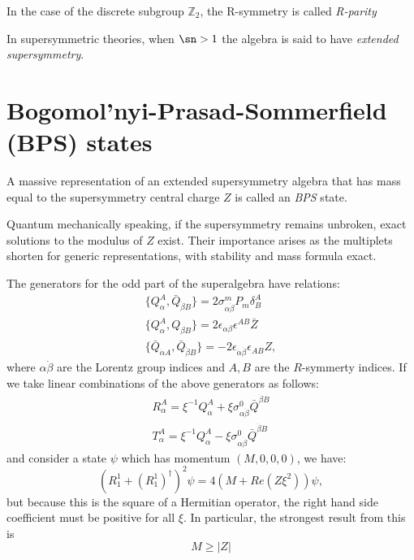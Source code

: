 \begin{remark}
In the case of the discrete subgroup $\mathbb{Z}_2$, the R-symmetry is called \textit{R-parity}
\end{remark}

\begin{definition}
In supersymmetric theories, when $\sn>1$ the algebra is said to have
\textit{extended supersymmetry}.
\end{definition}

\section{Bogomol'nyi-Prasad-Sommerfield (BPS) states}
\begin{definition}
A massive representation of an extended supersymmetry algebra that has mass
equal to the supersymmetry central charge $Z$ is called an \textit{BPS} state.
\end{definition}

Quantum mechanically speaking, if the supersymmetry remains unbroken, exact
solutions to the modulus of $Z$ exist. Their importance arises as the
multiplets shorten for generic representations, with stability and mass formula
exact.

\begin{example}[$d=4$,$\sn=2$]
The generators for the odd part of the superalgebra have relations:
\begin{gather}
  \{Q_\alpha^A,\bar{Q}_{\dot{\beta}B}\} = 2\sigma^m_{\alpha\dot{\beta}}P_m\delta^A_B \\
  \{Q_\alpha^A,Q_{\beta B}\} = 2\epsilon_{\alpha\beta}\epsilon^{AB}\bar{Z}\\
  \{\bar{Q}_{\dot{\alpha}A},\bar{Q}_{\dot{\beta}B}\}
  = -2\epsilon_{\dot{\alpha}\dot{\beta}}\epsilon_{AB}Z,
\end{gather}
where $\alpha\dot{\beta}$ are the Lorentz group indices and $A,B$ are the
$R$-symmerty indices.
If we take linear combinations of the above generators as follows:
\begin{gather}
  R_\alpha^A = \xi^{-1}Q_\alpha^A
  + \xi\sigma^0_{\alpha\dot{\beta}}\bar{Q}^{\dot{\beta}B}\\
  T_\alpha^A = \xi^{-1}Q_\alpha^A - \xi\sigma^0_{\alpha\dot{\beta}}\bar{Q}^{\dot{\beta}B}
\end{gather}
and consider a state $\psi$ which has momentum $(M,0,0,0)$, we have:
\begin{equation}
  \left(R_1^1+(R_1^1)^\dagger\right)^2\psi = 4(M+Re(Z\xi^2))\psi,
\end{equation}
but because this is the square of a Hermitian operator, the right hand side
coefficient must be positive for all $\xi$. In particular, the strongest result from this is
\begin{equation}
  M\geq|Z|
\end{equation}
\end{example}
